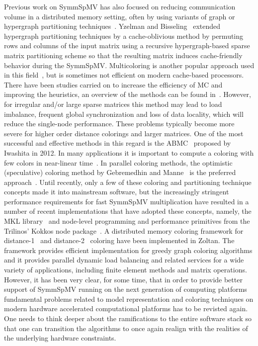  Previous
work on  \acrshort{SymmSpMV}  has also focused on reducing
communication volume in a distributed memory setting, often by using
variants of graph or hypergraph partitioning
techniques~\cite{Catalyurek:1999}. Yzelman and
Bisseling~\cite{doi:10.1137/080733243,Yzelman-thesis-2011} extended
hypergraph partitioning techniques by a cache-oblivious method by
permuting rows and columns of the input matrix using a recursive
hypergraph-based sparse matrix partitioning scheme so that the
resulting matrix induces cache-friendly behavior during the
\acrshort{SymmSpMV}. Multicoloring is another popular approach used in this
field~\cite{MC}, but is sometimes not efficient on modern cache-based
processors. There have been studies carried on to increase the
efficiency of \acrfull{MC} and
improving the heuristics, an overview of the methods can be found
in~\cite{dist_k_def,COLPACK,equitable_color}. However, 
for irregular and/or large sparse 
matrices this method may lead to load imbalance, frequent global synchronization 
and loss of data locality, which will reduce the single-node performance. 
These problems typically become more severe for higher order distance
colorings and larger matrices.
One of the most
successful and effective methods in this regard is
the \acrfull{ABMC}~\cite{ABMC} proposed by Iwashita \etal in 2012. In
many applications it is important to compute a coloring with few
colors in near-linear time~\cite{doi:10.1137/13093426X}.
 In parallel coloring methods, the optimistic (speculative) coloring method by Gebremedhin
and Manne~\cite{gebremedhin2000scalable} is the preferred
approach~\cite{Boman:2016}.  Until recently, only a few of these
coloring and partitioning technique concepts made it into mainstream
software, but the increasingly stringent performance requirements for
fast \acrshort{SymmSpMV} multiplication have resulted in a number of recent
implementations that have adopted these concepts, namely,
the \acrshort{MKL} library~\cite{MKL} and node-level programming and
performance primitives from the Trilinos’ Kokkos node
package~\cite{kokkos}. A distributed memory coloring framework for
distance-1~\cite{BOZDAG2008515} and
distance-2~\cite{doi:10.1137/080732158} coloring have been implemented
in Zoltan. The framework provides efficient implementation for greedy
graph coloring algorithms and it provides parallel dynamic load
balancing and related services for a wide variety of applications,
including finite element methods and matrix operations.  
%
However, it has been very clear, for some time, that in order to provide better
support of \acrshort{SymmSpMV} running on the next generation of
computing platforms fundamental problems related to model
representation and coloring techniques on modern hardware accelerated
computational platforms has to be revisted again. One needs to think
deeper about the ramifications to the entire software stack so
that one can transition the algorithms to once again realign with the
realities of the underlying hardware constraints. 

